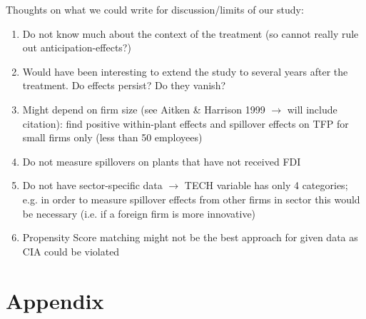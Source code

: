 \documentclass[a4paper,11pt]{scrartcl}
\newcommand{\sectionnumbering}[1]{%
  \setcounter{section}{0}%
   \renewcommand{\thesection}{\csname #1\endcsname{section}}}
\begin{document}
Thoughts on what we could write for discussion/limits of our study: 
\begin{enumerate}
\item Do not know much about the context of the treatment (so cannot really rule out anticipation-effects?)
\item Would have been interesting to extend the study to several years after the treatment. Do effects persist? Do they vanish? 
\item Might depend on firm size (see Aitken \& Harrison 1999 $\rightarrow$ will include citation): find positive within-plant effects and spillover effects on TFP for small firms only (less than 50 employees)
\item Do not measure spillovers on plants that have not received FDI
\item Do not have sector-specific data $\rightarrow$ TECH variable has only 4 categories; e.g. in order to measure spillover effects from other firms in sector this would be necessary (i.e. if a foreign firm is more innovative)
\item Propensity Score matching might not be the best approach for given data as CIA could be violated
\end{enumerate}


\newpage

 
\newpage



\section*{Appendix}
\sectionnumbering{Roman}
\setcounter{page}{3} %
\end{document}
